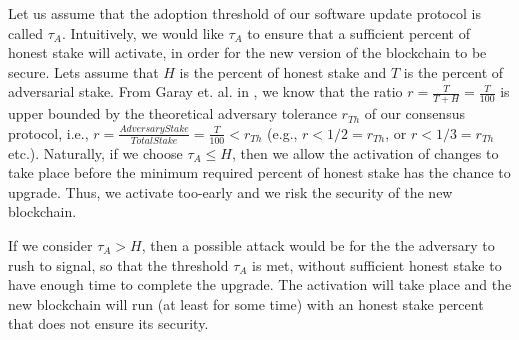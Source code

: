 {Let us assume that the adoption threshold of our software update protocol is called $\tau_A$. %
 Intuitively, we would like $\tau_A$ to ensure that a sufficient percent of honest stake will activate, in order for the new version of the blockchain to be secure. Lets assume that $H$ is the percent of honest stake and $T$ is the percent of adversarial stake. From Garay et. al. in \cite{sok}, we know that the ratio $r = \frac{T}{T+H} = \frac{T}{100}$ is upper bounded by the theoretical adversary tolerance $r_{Th}$ of our consensus protocol, i.e., $r = \frac{AdversaryStake}{TotalStake} = \frac{T}{100} < r_{Th}$ (e.g., $r < 1/2 = r_{Th}$, or $r < 1/3 = r_{Th}$ etc.).
 Naturally, if we choose $\tau_A \leq H$, then we allow the activation of changes to take place before the minimum required percent of honest stake has the chance to upgrade. Thus, we activate too-early and we risk the security of the new blockchain. 

If we consider $\tau_A > H$, then a possible attack would be for the the adversary to rush to signal, so that the threshold $\tau_A$ is met, without sufficient honest stake to have enough time to complete the upgrade. The activation will take place and the new blockchain will run (at least for some time) with an honest stake percent that does not ensure its security. 

}
